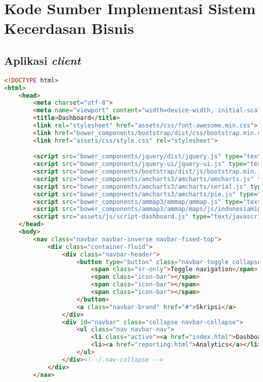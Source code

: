 \chapter{Kode Sumber Implementasi Sistem Kecerdasan Bisnis}
\label{app:H}

\singlespacing 
\section{Aplikasi \textit{client}}
\begin{lstlisting}[language=HTML,basicstyle=\tiny,caption=index.html]
<!DOCTYPE html>
<html>
    <head>
        <meta charset="utf-8">
        <meta name="viewport" content="width=device-width, initial-scale=1">
        <title>Dashboard</title>
        <link rel="stylesheet" href="assets/css/font-awesome.min.css">
        <link href="bower_components/bootstrap/dist/css/bootstrap.min.css" rel="stylesheet">
        <link href="assets/css/style.css" rel="stylesheet">

        <script src="bower_components/jquery/dist/jquery.js" type="text/javascript"></script>
        <script src="bower_components/jquery-ui/jquery-ui.js" type="text/javascript"></script>
        <script src="bower_components/bootstrap/dist/js/bootstrap.min.js"></script>
        <script src="bower_components/amcharts3/amcharts/amcharts.js" type="text/javascript"></script>
        <script src="bower_components/amcharts3/amcharts/serial.js" type="text/javascript"></script>
        <script src="bower_components/amcharts3/amcharts/pie.js" type="text/javascript"></script>
        <script src="bower_components/ammap3/ammap/ammap.js" type="text/javascript"></script>
        <script src="bower_components/ammap3/ammap/maps/js/indonesiaHigh.js" type="text/javascript"></script>
        <script src="assets/js/script-dashboard.js" type="text/javascript"></script>
    </head>
    <body>
        <nav class="navbar navbar-inverse navbar-fixed-top">
            <div class="container-fluid">
                <div class="navbar-header">
                    <button type="button" class="navbar-toggle collapsed" data-toggle="collapse" data-target="#navbar" aria-expanded="false" aria-controls="navbar">
                        <span class="sr-only">Toggle navigation</span>
                        <span class="icon-bar"></span>
                        <span class="icon-bar"></span>
                        <span class="icon-bar"></span>
                    </button>
                    <a class="navbar-brand" href="#">Skripsi</a>
                </div>
                <div id="navbar" class="collapse navbar-collapse">
                    <ul class="nav navbar-nav">
                        <li class="active"><a href="index.html">Dashboard</a></li>
                        <li><a href="reporting.html">Analytics</a></li>
                    </ul>
                </div><!--/.nav-collapse -->
            </div>
        </nav>


\end{lstlisting}
